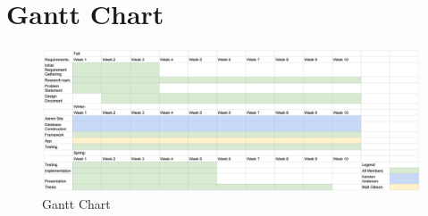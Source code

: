 \newpage
\section{Gantt Chart}

\begin{figure}[h]
\includegraphics[width=1\textwidth]{images/gantt.png}
\caption{Gantt Chart}
\end{figure}
